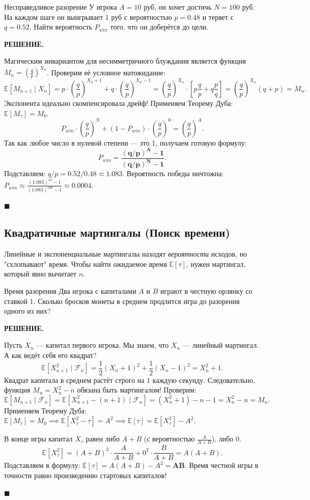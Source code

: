 \documentclass[12pt,a4paper]{article}
\newcommand{\nicefrac}[2]{#1/#2}
\newcommand{\E}{\mathbb{E}}
\newcommand{\F}{\mathcal{F}}
\newenvironment{solution}{
    \begin{tcolorbox}[
        enhanced, breakable, blanker,
        borderline west={2.5pt}{0pt}{solgray},
        left=12pt, top=5pt, bottom=5pt,
        before skip=10pt, after skip=15pt
    ]
    \textbf{\textsf{РЕШЕНИЕ.}}\;
}{
    \hfill $\blacksquare$
    \end{tcolorbox}
}
\begin{document}
\begin{problem}{Несправедливое разорение}{}
У игрока $A=10$ руб, он хочет достичь $N=100$ руб. На каждом шаге он выигрывает 1 руб с вероятностью $p=0.48$ и теряет с $q=0.52$. Найти вероятность $P_{win}$ того, что он доберётся до цели.
\end{problem}

\begin{solution}
Магическим инвариантом для несимметричного блуждания является функция $M_n = \left(\frac{q}{p}\right)^{X_n}$. 
Проверим её условное матожидание:
\[ \E[M_{n+1} \mid X_n] = p \cdot \left(\frac{q}{p}\right)^{X_n+1} + q \cdot \left(\frac{q}{p}\right)^{X_n-1} = \left(\frac{q}{p}\right)^{X_n} \cdot \left[ p \frac{q}{p} + q \frac{p}{q} \right] = \left(\frac{q}{p}\right)^{X_n} (q + p) = M_n. \]
Экспонента идеально скомпенсировала дрейф! Применяем Теорему Дуба: $\E[M_\tau] = M_0$.
\[ P_{win} \cdot \left(\frac{q}{p}\right)^N + (1 - P_{win}) \cdot \left(\frac{q}{p}\right)^0 = \left(\frac{q}{p}\right)^A. \]
Так как любое число в нулевой степени --- это 1, получаем готовую формулу:
\[ P_{win} = \mathbf{\frac{(q/p)^A - 1}{(q/p)^N - 1}}. \]
Подставляем: $q/p = \nicefrac{0.52}{0.48} \approx 1.083$. Вероятность победы ничтожна: $P_{win} \approx \frac{(1.083)^{10} - 1}{(1.083)^{100} - 1} \approx 0.0004$.
\end{solution}

\subsection{Квадратичные мартингалы (Поиск времени)}

Линейные и экспоненциальные мартингалы находят \textit{вероятности} исходов, но "схлопывают" время. Чтобы найти ожидаемое время $\E[\tau]$, нужен мартингал, который явно вычитает $n$.

\begin{problem}{Время разорения}{}
Два игрока с капиталами $A$ и $B$ играют в честную орлянку со ставкой 1. Сколько бросков монеты в среднем продлится игра до разорения одного из них?
\end{problem}

\begin{solution}
Пусть $X_n$ --- капитал первого игрока. Мы знаем, что $X_n$ — линейный мартингал. А как ведёт себя его квадрат?
\[ \E[X_{n+1}^2 \mid \F_n] = \frac{1}{2}(X_n + 1)^2 + \frac{1}{2}(X_n - 1)^2 = X_n^2 + 1. \]
Квадрат капитала в среднем растёт строго на $1$ каждую секунду. 
Следовательно, функция $M_n = X_n^2 - n$ обязана быть мартингалом! Проверим:
\[ \E[M_{n+1} \mid \F_n] = \E[X_{n+1}^2 - (n+1) \mid \F_n] = (X_n^2 + 1) - n - 1 = X_n^2 - n = M_n. \]
Применяем Теорему Дуба: $\E[M_\tau] = M_0 \implies \E[X_\tau^2 - \tau] = A^2 \implies \E[\tau] = \E[X_\tau^2] - A^2$.

В конце игры капитал $X_\tau$ равен либо $A+B$ (с вероятностью $\frac{A}{A+B}$), либо $0$.
\[ \E[X_\tau^2] = (A+B)^2 \cdot \frac{A}{A+B} + 0^2 \cdot \frac{B}{A+B} = A(A+B). \]
Подставляем в формулу: $\E[\tau] = A(A+B) - A^2 = \mathbf{AB}$. Время честной игры в точности равно произведению стартовых капиталов!
\end{solution}
\end{document}

